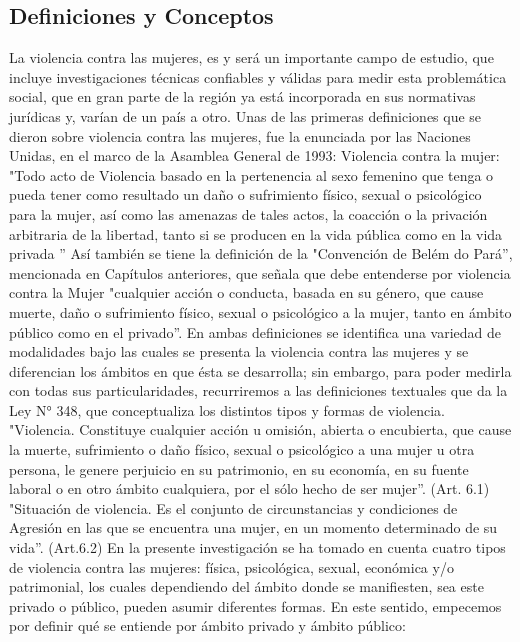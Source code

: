 \subsection{Definiciones y Conceptos}
La violencia contra las mujeres, es y será un importante campo de estudio, que incluye investigaciones técnicas confiables y válidas para medir esta problemática social, que en gran parte de la región ya está incorporada en sus normativas jurídicas y, varían de un país a otro.
Unas de las primeras definiciones que se dieron sobre violencia contra las mujeres, fue la enunciada por las Naciones Unidas, en el marco de la Asamblea General de 1993:
Violencia contra la mujer: "Todo acto de Violencia basado en la pertenencia al sexo femenino que tenga o pueda tener como resultado un daño o sufrimiento físico, sexual o psicológico para la mujer, así como las amenazas de tales actos, la coacción o la privación arbitraria de la libertad, tanto si se producen en la vida pública como en la vida privada ''
Así también se tiene la definición de la "Convención de Belém do Pará'', mencionada en Capítulos anteriores, que señala que debe entenderse por violencia contra la Mujer "cualquier acción o conducta, basada en su género,
que cause muerte, daño o sufrimiento físico, sexual o psicológico a la mujer, tanto en ámbito público como en el privado''.
En ambas definiciones se identifica una variedad de modalidades bajo las cuales se presenta la violencia contra las mujeres y se diferencian los ámbitos en que ésta se desarrolla; sin embargo, para poder medirla con todas sus particularidades, recurriremos a las definiciones textuales que da la Ley N° 348, que conceptualiza los distintos tipos y formas de violencia.
"Violencia. Constituye cualquier acción u omisión, abierta o encubierta, que cause la muerte, sufrimiento o daño físico, sexual o psicológico a una mujer u otra persona, le genere perjuicio en su patrimonio, en su economía, en su fuente laboral o en otro ámbito cualquiera, por el sólo hecho de ser mujer''. (Art. 6.1)
"Situación de violencia. Es el conjunto de circunstancias y condiciones de Agresión en las que se encuentra una mujer, en un momento determinado de su vida''. (Art.6.2)
En la presente investigación se ha tomado en cuenta cuatro tipos de violencia contra las mujeres: física, psicológica, sexual, económica y/o patrimonial, los cuales dependiendo del ámbito donde se manifiesten, sea este privado o público, pueden asumir diferentes formas. En este sentido, empecemos por definir qué se entiende por ámbito privado y ámbito público:

